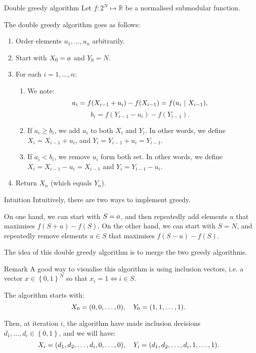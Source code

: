 \documentclass[a4paper]{article}
\begin{document}
\begin{parag}{Double greedy algorithm}
    Let $f: 2^N \mapsto \mathbb{R}$ be a normalised submodular function.

    The double greedy algorithm goes as follows:
    \begin{enumerate}
        \item Order elements $u_1, \ldots, u_n$ arbitrarily.
        \item Start with $X_0 = \o$ and $Y_0 = N$.
        \item For each $i = 1, \ldots, n$: 
            \begin{enumerate}
                \item We note: 
                \[a_i = f\left(X_{i-1} + u_i\right) - f\left(X_{i-1}\right) = f\left(u_i \suchthat X_{i-1}\right),\] 
                \[b_i = f\left(Y_{i-1} - u_i\right) - f\left(Y_{i-1}\right).\]
                \item If $a_i \geq b_i$, we add $u_i$ to both $X_i$ and $Y_i$. In other words, we define $X_i = X_{i-1} + u_i$, and $Y_i = Y_{i-1} + u_i = Y_{i-1}$.
                \item  If $a_i < b_i$, we remove $u_i$ form both set. In other words, we define $X_i = X_{i-1} - u_i = X_{i-1}$ and $Y_i = Y_{i-1} - u_i$.
            \end{enumerate}
        \item Return $X_n$ (which equals $Y_n$).
    \end{enumerate}

    \begin{subparag}{Intuition}
        Intuitively, there are two ways to implement greedy.

        On one hand, we can start with $S = \o$, and then repeatedly add elements $u$ that maximises $f\left(S + u\right) - f\left(S\right)$. On the other hand, we can start with $S = N$, and repeatedly remove elements $u \in S$ that maximises $f\left(S - u\right) - f\left(S\right)$.

        The idea of this double greedy algorithm is to merge the two greedy algorithms.
    \end{subparag}

    \begin{subparag}{Remark}
        A good way to visualise this algorithm is using inclusion vectors, i.e. a vector $x \in \left\{0, 1\right\}^N$ so that $x_i = 1 \iff i \in S$.

        The algorithm starts with: 
        \[X_0 = \left(0, 0, \ldots, 0\right), \mathspace Y_0 = \left(1, 1, \ldots, 1\right).\]
        
        Then, at iteration $i$, the algorithm have made inclusion decisions $d_1, \ldots, d_i \in \left\{0, 1\right\}$, and we will have: 
        \[X_i = \left(d_1, d_2, \ldots, d_i, 0, \ldots, 0\right), \mathspace Y_i = \left(d_1, d_2, \ldots, d_i, 1, \ldots, 1\right).\]
    \end{subparag}
\end{parag}
\end{document}

